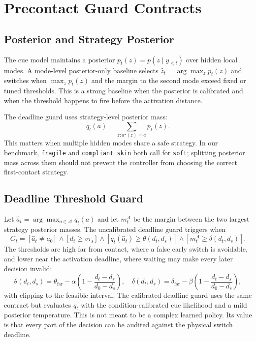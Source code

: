 \documentclass{article}
\begin{document}
\section{Precontact Guard Contracts}

\subsection{Posterior and Strategy Posterior}

The cue model maintains a posterior $p_t(z)=p(z\mid y_{\leq t})$ over hidden local modes. A mode-level posterior-only baseline selects $\hat z_t=\arg\max_z p_t(z)$ and switches when $\max_z p_t(z)$ and the margin to the second mode exceed fixed or tuned thresholds. This is a strong baseline when the posterior is calibrated and when the threshold happens to fire before the activation distance.

The deadline guard uses strategy-level posterior mass:
\begin{equation}
q_t(a) = \sum_{z: a^\star(z)=a} p_t(z).
\end{equation}
This matters when multiple hidden modes share a safe strategy. In our benchmark, \texttt{fragile} and \texttt{compliant skin} both call for \texttt{soft}; splitting posterior mass across them should not prevent the controller from choosing the correct first-contact strategy.

\subsection{Deadline Threshold Guard}

Let $\hat a_t = \arg\max_{a\in\mathcal{A}} q_t(a)$ and let $m_t^A$ be the margin between the two largest strategy posterior masses. The uncalibrated deadline guard triggers when
\begin{equation}
G_t =
\left[\hat a_t \neq a_0\right]
\wedge
\left[d_t \geq v\tau_s\right]
\wedge
\left[q_t(\hat a_t) \geq \theta(d_t,d_s)\right]
\wedge
\left[m_t^A \geq \delta(d_t,d_s)\right].
\end{equation}
The thresholds are high far from contact, where a false early switch is avoidable, and lower near the activation deadline, where waiting may make every later decision invalid:
\begin{equation}
\theta(d_t,d_s)=\theta_{\mathrm{far}}-\alpha\left(1-\frac{d_t-d_s}{d_0-d_s}\right),\quad
\delta(d_t,d_s)=\delta_{\mathrm{far}}-\beta\left(1-\frac{d_t-d_s}{d_0-d_s}\right),
\end{equation}
with clipping to the feasible interval. The calibrated deadline guard uses the same contract but evaluates $q_t$ with the condition-calibrated cue likelihood and a mild posterior temperature. This is not meant to be a complex learned policy. Its value is that every part of the decision can be audited against the physical switch deadline.
\end{document}
